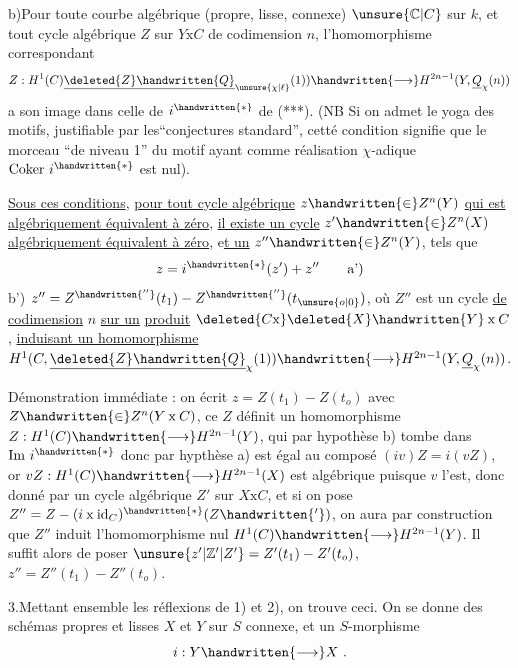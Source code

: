 b)\quad Pour toute courbe algébrique (propre, lisse, connexe) $\unsure{\mathbb{C}|C}$ sur $k$, et tout cycle algébrique $Z$ sur $Y\mathbin{\mathrm{x}}C$ de codimension $n$, l'homomorphisme correspondant
\[
Z:H^1(C)\underline{\deleted{Z}\handwritten{Q}}_{\unsure{\chi|\ell}}(1))\handwritten{\longrightarrow}H^{2n-1}(Y,\underline{Q}_{\chi}(n))
\]
a son image dans celle de $i^{\handwritten{*}}$ de (***). (NB Si on admet le yoga des motifs, justifiable par les``conjectures standard'', cetté condition signifie que le  morceau  ``de niveau 1'' du motif  ayant comme réalisation $\chi$-adique $\mathrm{Coker}\ i^{\handwritten{*}}$ est nul).

\uline{Sous ces conditions}, \uline{pour tout cycle algébrique} $z\handwritten{\in}Z^n(Y)$ \uline{qui est algébriquement équivalent à zéro}, \uline{il existe un cycle} $z'\handwritten{\in}Z^n(X)$ \uline{algébriquement équivalent à zéro}, e\uline{t un} $z''\handwritten{\in}Z^n(Y)$, tels que
\[
z=i^{\handwritten{*}}(z')+z''\tag*{a')}
\]
b')\quad {} $z''=Z^{\handwritten{''}}(t_1)-Z^{\handwritten{''}}(t_{\unsure{o|0}})$, où $Z''$ est un cycle \uline{de codimension} $n$ \uline{sur un} \uline{produit} $\deleted{C\mathrm{x}}\deleted{X}\handwritten{Y}\mathbin{\mathrm{x}}C$, \uline{induisant un homomorphisme}   $H^1(C,\underline{\deleted{Z}\handwritten{Q}}_{\chi}(1))\handwritten{\longrightarrow}H^{2n-1}(Y,\underline{Q}_{\chi}(n))$.

Démonstration immédiate : on écrit $z=Z(t_1)-Z(t_o)$ avec $Z\handwritten{\in}Z^n(Y\mathbin{\mathrm{x}}C)$, ce $Z$ définit un homomorphisme $Z:H^1(C)\handwritten{\longrightarrow}H^{2n-1}(Y)$,  qui par hypothèse b) tombe dans $\mathrm{Im}\ i^{\handwritten{*}}$ donc par hypthèse a) est égal au composé $(iv)Z=i(vZ)$, or $vZ:H^1(C)\handwritten{\longrightarrow}H^{2n-1}(X)$ est algébrique puisque $v$ l'est, donc donné par un cycle algébrique $Z'$ sur $X\mathbin{\mathrm{x}}C$, et si on pose $Z''=Z-(i\mathbin{\mathrm{x}}\mathrm{id}_C)^{\handwritten{*}}(Z\handwritten{'} )$, on aura par construction que $Z''$ induit l'homomorphisme nul $H^1(C)\handwritten{\longrightarrow}H^{2n-1}(Y)$.  Il suffit alors de poser $\unsure{z'|\mathbb{Z}'|Z'}=Z'(t_1)-Z'(t_o)$, $z''=Z''(t_1)-Z''(t_o)$.

3.\quad Mettant ensemble les réflexions de 1) et 2), on trouve ceci. On se donne des schémas propres et lisses $X$ et $Y$ sur $S$  connexe, et un $S$-morphisme
\[
i:Y\handwritten{\longrightarrow}X\ .
\]
